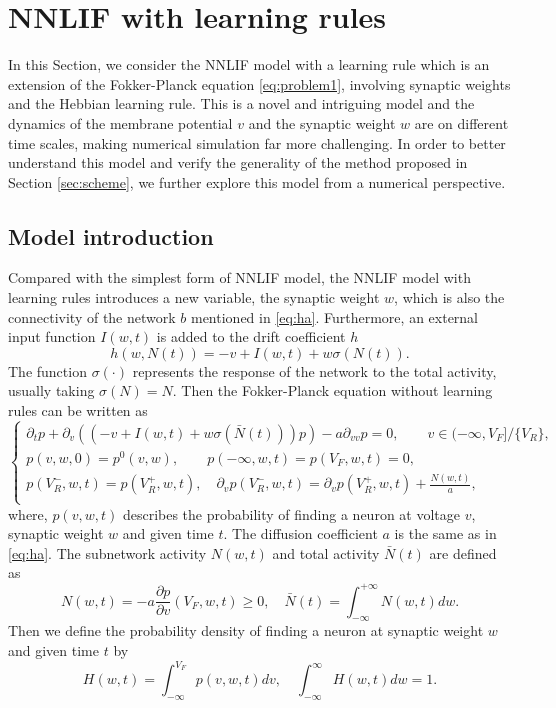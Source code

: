\section{NNLIF with learning rules}\label{sec:lr}
In this Section, we consider the NNLIF model with a learning rule which is an extension of the Fokker-Planck equation \eqref{eq:problem1}, involving synaptic weights and the Hebbian learning rule. This is a novel and intriguing model and the dynamics of the membrane potential $v$ and the synaptic weight $w$ are on different time scales, making numerical simulation far more challenging. In order to better understand this model and verify the generality of the method proposed in Section \ref{sec:scheme}, we further explore this model from a numerical perspective. 

\subsection{Model introduction}


Compared with the simplest form of NNLIF model, the NNLIF model with learning rules introduces a new variable, the synaptic weight $w$, which is also the connectivity of the network $b$ mentioned in \eqref{eq:ha}. Furthermore, an external input function $I(w,t)$ is added to the drift coefficient $h$
\begin{equation}
    h(w,N(t))=-v+I(w,t)+w\sigma(N(t)).
\end{equation}
The function $\sigma(\cdot)$ represents the response of the network to the total activity, usually taking $\sigma(N)=N$. Then the Fokker-Planck equation without learning rules can be written as 
\begin{equation}
    \label{eq:problem3}
    \begin{cases}
        \partial_{t}p+\partial_{v}((-v+I(w,t)+w\sigma(\bar{N}(t)))p)-a\partial_{v v}p=0,\qquad v\in(-\infty,V_F]/\{V_R\},\\
        p(v,w,0)=p^0(v,w),\qquad p(-\infty,w,t)=p(V_F,w,t)=0,\\
        p(V^-_R,w,t)=p(V^+_R,w,t),\quad \partial _vp(V^-_R,w,t)=\partial _vp(V^+_R,w,t)+\frac{N(w,t)}{a},\\
    \end{cases}
\end{equation}
where, $p(v,w,t)$ describes the probability of finding a neuron at voltage $v$, synaptic weight $w$ and given time $t$. The diffusion coefficient $a$ is the same as in \eqref{eq:ha}. The subnetwork activity $N(w, t)$ and total activity
$\bar{N}(t)$ are defined as
\begin{equation}
    N(w,t)=-a\frac{\partial p}{\partial v}(V_F,w,t)\geq 0,\quad \bar{N}(t)=\int_{-\infty}^{+\infty}N(w,t)dw.
\end{equation}
Then we define the probability density of finding a neuron at synaptic weight $w$ and given time $t$ by 
\begin{equation}
    H(w, t)=\int_{-\infty}^{V_{F}} p(v, w, t) d v, \quad \int_{-\infty}^{\infty} H(w, t) d w=1 .
\end{equation}


